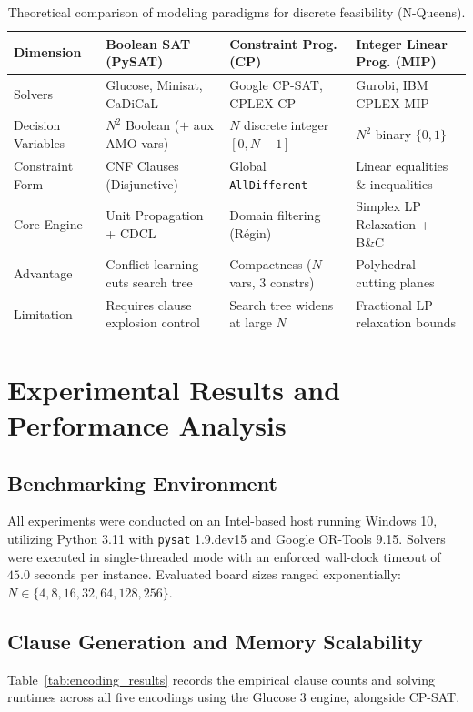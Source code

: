 \documentclass[a4paper,fleqn]{cas-sc}
\begin{document}
\begin{table}[ht]
\centering
\caption{Theoretical comparison of modeling paradigms for discrete feasibility (N-Queens).}
\label{tab:paradigms}
\begin{tabular*}{\tblwidth}{@{}llll@{}}
\toprule
Dimension & Boolean SAT (PySAT) & Constraint Prog. (CP) & Integer Linear Prog. (MIP) \\
\midrule
Solvers & Glucose, Minisat, CaDiCaL & Google CP-SAT, CPLEX CP & Gurobi, IBM CPLEX MIP \\
Decision Variables & $N^2$ Boolean ($+$ aux AMO vars) & $N$ discrete integer $[0, N-1]$ & $N^2$ binary $\{0, 1\}$ \\
Constraint Form & CNF Clauses (Disjunctive) & Global \texttt{AllDifferent} & Linear equalities \& inequalities \\
Core Engine & Unit Propagation + CDCL & Domain filtering (R\'egin) & Simplex LP Relaxation + B\&C \\
Advantage & Conflict learning cuts search tree & Compactness ($N$ vars, 3 constrs) & Polyhedral cutting planes \\
Limitation & Requires clause explosion control & Search tree widens at large $N$ & Fractional LP relaxation bounds \\
\bottomrule
\end{tabular*}
\end{table}

\section{Experimental Results and Performance Analysis}

\subsection{Benchmarking Environment}
All experiments were conducted on an Intel-based host running Windows 10, utilizing Python 3.11 with \texttt{pysat} 1.9.dev15 and Google OR-Tools 9.15. Solvers were executed in single-threaded mode with an enforced wall-clock timeout of $45.0$ seconds per instance. Evaluated board sizes ranged exponentially: $N \in \{4, 8, 16, 32, 64, 128, 256\}$.

\subsection{Clause Generation and Memory Scalability}
Table~\ref{tab:encoding_results} records the empirical clause counts and solving runtimes across all five encodings using the Glucose 3 engine, alongside CP-SAT.
\end{document}
